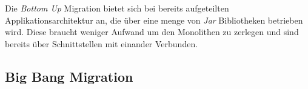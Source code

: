 	Die \textit{Bottom Up} Migration bietet sich bei bereits aufgeteilten Applikationsarchitektur an, die über eine menge von \textit{Jar} Bibliotheken betrieben wird. Diese braucht weniger Aufwand um den Monolithen zu zerlegen und sind bereits über Schnittstellen mit einander Verbunden.  






\subsection{Big Bang Migration}

